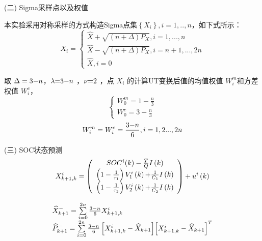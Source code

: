 (二)	Sigma采样点以及权值

本实验采用对称采样的方式构造Sigma点集$\left\{ {{X_i}} \right\},i = 1,..,n$，如下式所示：
\begin{equation}
{X_i} = \left\{ \begin{array}{l}
\hat X + \sqrt {(n + \Delta ){P_X}} ,i = 1,...,n\\
\hat X - \sqrt {(n + \Delta ){P_X}} ,i = n + 1,...,2n\\
\hat X,i = 0
\end{array} \right.
\end{equation}

取 $\Delta  = 3{\rm{ - }}n$，$\lambda {\rm{ = }}3{\rm{ - }}n$ ，$\nu {\rm{ = }}2$ ，点 ${X_i}$ 的计算UT变换后值的均值权值 $W_i^m$和方差权值 $W_i^c$，	
\begin{equation}
\left\{ \begin{array}{l}
W_0^m = 1 - \frac{n}{3}\\
W_0^c = 3 - \frac{n}{3}
\end{array} \right.
\end{equation}
\begin{equation}
W_i^m = W_i^c = \frac{{3{\rm{ - }}n}}{6},i = 1,2...,2n
\end{equation}

(三)	SOC状态预测
\begin{equation}
X_{k + 1,k}^i = \left( {\begin{array}{*{20}{c}}
{SO{C^i}(k) - \frac{T}{Q}I\left( k \right)}\\
{\left( {1 - \frac{1}{{{\tau _1}}}} \right)V_1^i\left( k \right){\rm{ + }}\frac{1}{{{C_1}}}I\left( k \right)}\\
{\left( {1 - \frac{1}{{{\tau _2}}}} \right)V_2^i\left( k \right){\rm{ + }}\frac{1}{{{C_2}}}I\left( k \right)}
\end{array}} \right) + {u^i}\left( k \right)
\end{equation}

\begin{equation}
\begin{array}{l}
\widehat X_{k + 1}^ -  = \sum\limits_{i = 0}^{2n} {\frac{{3{\rm{ - }}n}}{6}X_{k + 1,k}^i} \\
\widehat P_{k + 1}^ -  = \sum\limits_{i = 0}^{2n} {\frac{{3{\rm{ - }}n}}{6}\left[ {X_{k + 1,k}^i - {{\widehat X}_{k + 1}}} \right]} {\left[ {X_{k + 1,k}^i - {{\widehat X}_{k + 1}}} \right]^T}
\end{array}
\end{equation}

